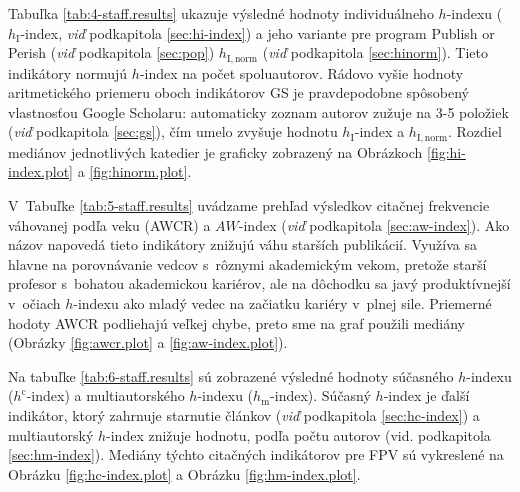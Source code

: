 Tabuľka \ref{tab:4-staff.results} ukazuje výsledné hodnoty individuálneho
$h$-indexu ($h_{\mathrm{I}}$-index, \emph{viď} podkapitola \ref{sec:hi-index}) a jeho
variante pre program Publish or Perish (\emph{viď} podkapitola \ref{sec:pop})
$h_{\mathrm{I,norm}}$ (\emph{viď} podkapitola \ref{sec:hinorm}). Tieto indikátory
normujú $h$-index na počet spoluautorov. Rádovo vyšie hodnoty aritmetického
priemeru oboch indikátorov GS je pravdepodobne spôsobený vlastnosťou Google Scholaru:
automaticky zoznam autorov zužuje na 3-5 položiek (\emph{viď} podkapitola \ref{sec:gs}),
čím umelo zvyšuje hodnotu $h_{\mathrm{I}}$-index a $h_{\mathrm{I,norm}}$.
Rozdiel mediánov jednotlivých katedier je graficky zobrazený na Obrázkoch \ref{fig:hi-index.plot} a
\ref{fig:hinorm.plot}.

V~Tabuľke \ref{tab:5-staff.results} uvádzame prehľad výsledkov citačnej frekvencie váhovanej
podľa veku (AWCR) a $AW$-index (\emph{viď} podkapitola \ref{sec:aw-index}). Ako názov napovedá
tieto indikátory znižujú váhu starších publikácií. Využíva sa hlavne na porovnávanie
vedcov s~rôznymi akademickým vekom, pretože starší profesor s~bohatou akademickou kariérov, ale
na dôchodku sa javý produktívnejší v~očiach $h$-indexu ako mladý vedec na začiatku kariéry
v~plnej sile. Priemerné hodoty AWCR podliehajú veľkej chybe, preto sme na graf použili
mediány (Obrázky \ref{fig:awcr.plot} a \ref{fig:aw-index.plot}).

Na tabuľke \ref{tab:6-staff.results} sú zobrazené výsledné hodnoty súčasného $h$-indexu
($h^{\mathrm{c}}$-index) a multiautorského $h$-indexu ($h_{\mathrm{m}}$-index).
Súčasný $h$-index je ďalší indikátor, ktorý zahrnuje starnutie článkov (\emph{viď} podkapitola \ref{sec:hc-index}) a
multiautorský $h$-index znižuje hodnotu, podľa počtu autorov (vid. podkapitola \ref{sec:hm-index}).
Mediány týchto citačných indikátorov pre FPV sú vykreslené na Obrázku \ref{fig:hc-index.plot} a Obrázku \ref{fig:hm-index.plot}.

